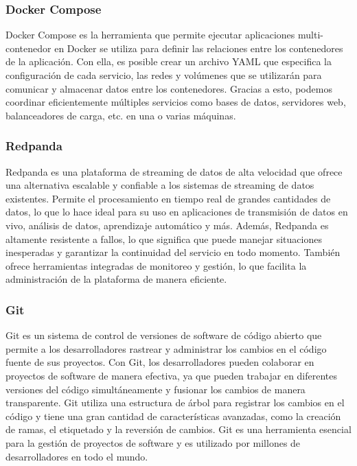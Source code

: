 \subsubsection{Docker Compose}

Docker Compose es la herramienta que permite ejecutar aplicaciones multi-contenedor en Docker se utiliza para definir las relaciones entre los contenedores de la aplicación. Con ella, es posible crear un archivo YAML que especifica la configuración de cada servicio, las redes y volúmenes que se utilizarán para comunicar y almacenar datos entre los contenedores. Gracias a esto, podemos coordinar eficientemente múltiples servicios como bases de datos, servidores web, balanceadores de carga, etc. en una o varias máquinas. 


\subsubsection{Redpanda}

Redpanda es una plataforma de streaming de datos de alta velocidad que ofrece una alternativa escalable y confiable a los sistemas de streaming de datos existentes. Permite el procesamiento en tiempo real de grandes cantidades de datos, lo que lo hace ideal para su uso en aplicaciones de transmisión de datos en vivo, análisis de datos, aprendizaje automático y más. Además, Redpanda es altamente resistente a fallos, lo que significa que puede manejar situaciones inesperadas y garantizar la continuidad del servicio en todo momento. También ofrece herramientas integradas de monitoreo y gestión, lo que facilita la administración de la plataforma de manera eficiente.


\subsubsection{Git}

Git es un sistema de control de versiones de software de código abierto que permite a los desarrolladores rastrear y administrar los cambios en el código fuente de sus proyectos. Con Git, los desarrolladores pueden colaborar en proyectos de software de manera efectiva, ya que pueden trabajar en diferentes versiones del código simultáneamente y fusionar los cambios de manera transparente. Git utiliza una estructura de árbol para registrar los cambios en el código y tiene una gran cantidad de características avanzadas, como la creación de ramas, el etiquetado y la reversión de cambios. Git es una herramienta esencial para la gestión de proyectos de software y es utilizado por millones de desarrolladores en todo el mundo.


